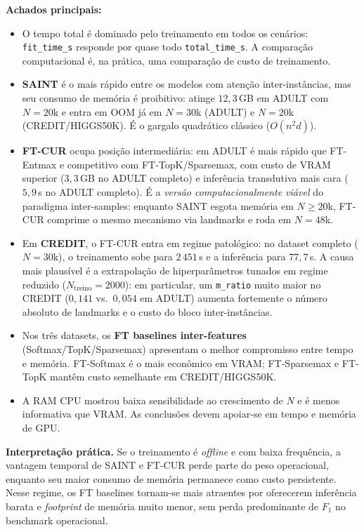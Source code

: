 \documentclass[12pt,a4paper]{article}
\begin{document}
\textbf{Achados principais:}
\begin{itemize}
  \item O tempo total é dominado pelo treinamento em todos os cenários:
        \texttt{fit\_time\_s} responde por quase todo \texttt{total\_time\_s}.
        A comparação computacional é, na prática, uma comparação de custo de
        treinamento.
  \item \textbf{SAINT} é o mais rápido entre os modelos com atenção
        inter-instâncias, mas seu consumo de memória é proibitivo: atinge
        $12{,}3$\,GB em ADULT com $N{=}20$k e entra em OOM já em $N{=}30$k
        (ADULT) e $N{=}20$k (CREDIT/HIGGS50K). É o gargalo quadrático
        clássico ($O(n^2 d)$).
  \item \textbf{FT-CUR} ocupa posição intermediária: em ADULT é mais rápido
        que FT-Entmax e competitivo com FT-TopK/Sparsemax, com custo de
        VRAM superior ($3{,}3$\,GB no ADULT completo) e inferência
        transdutiva mais cara ($5{,}9$\,s no ADULT completo). É a
        \emph{versão computacionalmente viável} do paradigma inter-samples:
        enquanto SAINT esgota memória em $N \geq 20$k, FT-CUR comprime o
        mesmo mecanismo via landmarks e roda em $N=48$k.
  \item Em \textbf{CREDIT}, o FT-CUR entra em regime patológico: no
        dataset completo ($N{=}30$k), o treinamento sobe para $2\,451$\,s
        e a inferência para $77{,}7$\,s. A causa mais plausível é a
        extrapolação de hiperparâmetros tunados em regime reduzido
        ($N_{\text{treino}}=2000$): em particular, um \texttt{m\_ratio}
        muito maior no CREDIT ($0{,}141$ vs.\ $0{,}054$ em ADULT) aumenta
        fortemente o número absoluto de landmarks e o custo do bloco
        inter-instâncias.
  \item Nos três datasets, os \textbf{FT baselines inter-features}
        (Softmax/TopK/Sparsemax) apresentam o melhor compromisso entre
        tempo e memória. FT-Softmax é o mais econômico em VRAM;
        FT-Sparsemax e FT-TopK mantêm custo semelhante em CREDIT/HIGGS50K.
  \item A RAM CPU mostrou baixa sensibilidade ao crescimento de $N$ e é
        menos informativa que VRAM. As conclusões devem apoiar-se em tempo
        e memória de GPU.
\end{itemize}

\textbf{Interpretação prática.} Se o treinamento é \emph{offline} e com
baixa frequência, a vantagem temporal de SAINT e FT-CUR perde parte do peso
operacional, enquanto seu maior consumo de memória permanece como custo
persistente. Nesse regime, os FT baselines tornam-se mais atraentes por
oferecerem inferência barata e \emph{footprint} de memória muito menor,
sem perda predominante de $F_1$ no benchmark operacional.
\end{document}
